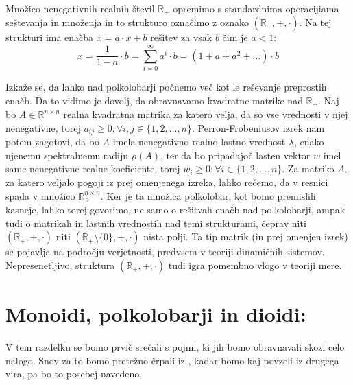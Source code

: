 \documentclass[mat1]{fmfdelo}
\newcommand{\R}{\mathbb{R}}
\newcommand{\Pplus}[1]{\mathbb{#1}_{+}}
\begin{document}
\begin{zgled}
	Množico nenegativnih realnih števil $\Pplus{R}$ opremimo s standardnima operacijiama seštevanja in množenja in to strukturo označimo z oznako $(\Pplus{R}, +, \cdot)$. Na tej strukturi ima enačba $x = a\cdot x + b$ rešitev za vsak $b$ čim je $a < 1$: $$ x = \frac{1}{1 - a} \cdot b = \sum_{i = 0}^{\infty}a^i \cdot b = (1 + a + a^2 + \ldots)\cdot b$$
\end{zgled}

Izkaže se, da lahko nad polkolobarji počnemo več kot le reševanje preprostih enačb. Da to vidimo je dovolj, da obravnavamo kvadratne matrike nad $\Pplus{R}$. Naj bo $A \in\R^{n\times n}$ realna kvadratna matrika za katero velja, da so vse vrednosti v njej nenegativne, torej $a_{ij} \geq 0, \forall i, j \in \{1, 2, \ldots, n\}$. Perron-Frobeniusov izrek nam potem zagotovi, da bo $A$ imela nenegativno realno lastno vrednost $\lambda$, enako njenemu spektralnemu radiju $\rho(A)$, ter da bo pripadajoč lasten vektor $w$ imel same nenegativne realne koeficiente, torej $w_i \geq 0; \forall i\in \{1, 2, \ldots, n\}$. 
Za matriko $A$, za katero veljalo pogoji iz prej omenjenega izreka, lahko rečemo, da v resnici spada v množico $\Pplus{R}^{n\times n}$. Ker je ta množica polkolobar, kot bomo premislili kasneje, lahko torej govorimo, ne samo o rešitvah enačb nad polkolobarji, ampak tudi o matrikah in lastnih vrednostih nad temi strukturami, čeprav niti $(\Pplus{R}, +, \cdot)$ niti $(\Pplus{R}\setminus\{0\}, +, \cdot)$ nista polji. Ta tip matrik (in prej omenjen izrek) se pojavlja na področju verjetnosti, predvsem v teoriji dinamičnih sistemov. Nepresenetljivo, struktura $(\Pplus{R}, +, \cdot)$ tudi igra pomembno vlogo v teoriji mere.

\section{Monoidi, polkolobarji in dioidi:}
V tem razdelku se bomo prvič srečali s pojmi, ki jih bomo obravnavali skozi celo nalogo. Snov za to bomo pretežno črpali iz \cite[Poglavje 1]{bib:Gondran}, kadar bomo kaj povzeli iz drugega vira, pa bo to posebej navedeno. 
\end{document}
